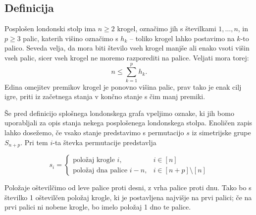 \documentclass[12pt,a4paper]{amsart}
\theoremstyle{definition} %
\theoremstyle{plain} %
\begin{document}
\subsection{Definicija}

Posplošen londonski stolp ima $n \geq 2$ krogel, označimo jih s številkami $1,\ldots,n$, in $p \geq 3$ palic, katerih višino označimo s $h_k$ -- toliko krogel lahko postavimo na $k$-to palico. Seveda velja, da mora biti število vseh krogel manjše ali enako vsoti višin vseh palic, sicer vseh krogel ne moremo razporediti na palice. Veljati mora torej:
\[ n \leq \sum_{k=1}^{p} h_k.\]
Edina omejitev premikov krogel je ponovno višina palic, prav tako je enak cilj igre, priti iz začetnega stanja v končno stanje s čim manj premiki.

Še pred definicijo splošnega londonskega grafa vpeljimo oznake, ki jih bomo uporabljali za opis stanja nekega posplošenega londonskega stolpa. Enoličen zapis lahko dosežemo, če vsako stanje predstavimo s permutacijo $s$ iz simetrijske grupe $S_{n+p}$. Pri tem $i$-ta števka permutacije predstavlja

\[ s_i =
\begin{cases}
    \text{položaj krogle } i, & i \in [n] \\
    \text{položaj dna palice } i-n, & i \in [n+p] \setminus [n]
\end{cases}
\]

Položaje oštevilčimo od leve palice proti desni, z vrha palice proti dnu. Tako bo s številko 1 oštevilčen položaj krogle, ki je postavljena najvišje na prvi palici; če na prvi palici ni nobene krogle, bo imelo položaj 1 dno te palice.
\end{document}
